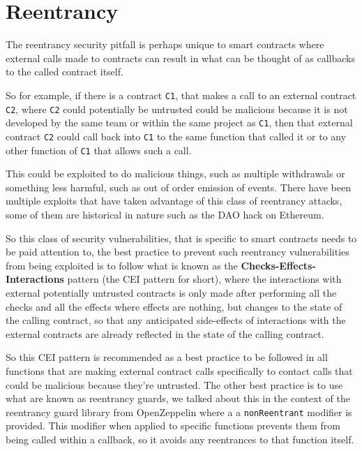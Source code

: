 \section{Reentrancy}\label{reentrancy}

The reentrancy security pitfall is perhaps unique to smart contracts
where external calls made to contracts can result in what can be thought
of as callbacks to the called contract itself.

So for example, if there is a contract \texttt{C1}, that makes a call to
an external contract \texttt{C2}, where \texttt{C2} could potentially be
untrusted could be malicious because it is not developed by the same
team or within the same project as \texttt{C1}, then that external
contract \texttt{C2} could call back into \texttt{C1} to the same
function that called it or to any other function of \texttt{C1} that
allows such a call.

This could be exploited to do malicious things, such as multiple
withdrawals or something less harmful, such as out of order emission of
events. There have been multiple exploits that have taken advantage of
this class of reentrancy attacks, some of them are historical in nature
such as the DAO hack on Ethereum.

So this class of security vulnerabilities, that is specific to smart
contracts needs to be paid attention to, the best practice to prevent
such reentrancy vulnerabilities from being exploited is to follow what
is known as the \textbf{Checks-Effects-Interactions} pattern (the CEI
pattern for short), where the interactions with external potentially
untrusted contracts is only made after performing all the checks and all
the effects where effects are nothing, but changes to the state of the
calling contract, so that any anticipated side-effects of interactions
with the external contracts are already reflected in the state of the
calling contract.

So this CEI pattern is recommended as a best practice to be followed in
all functions that are making external contract calls specifically to
contact calls that could be malicious because they're untrusted. The
other best practice is to use what are known as reentrancy guards, we
talked about this in the context of the reentrancy guard library from
OpenZeppelin where a a \texttt{nonReentrant} modifier is provided. This
modifier when applied to specific functions prevents them from being
called within a callback, so it avoids any reentrances to that function
itself.

